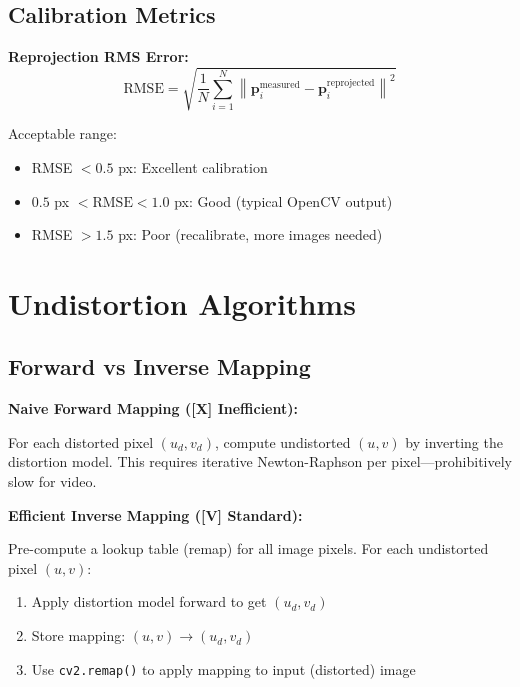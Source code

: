 \documentclass[11pt,a4paper,oneside]{article}
\begin{document}
\subsection{Calibration Metrics}

\textbf{Reprojection RMS Error:}
\begin{equation}
\text{RMSE} = \sqrt{\frac{1}{N} \sum_{i=1}^{N} \left\| \mathbf{p}_i^{\text{measured}} - \mathbf{p}_i^{\text{reprojected}} \right\|^2}
\label{eq:rmse}
\end{equation}

Acceptable range:
\begin{itemize}
    \item RMSE $< 0.5$ px: Excellent calibration
    \item $0.5$ px $< \text{RMSE} < 1.0$ px: Good (typical OpenCV output)
    \item RMSE $> 1.5$ px: Poor (recalibrate, more images needed)
\end{itemize}


\section{Undistortion Algorithms}
\label{sec:undistortion}

\subsection{Forward vs Inverse Mapping}

\textbf{Naive Forward Mapping ([X] Inefficient):}

For each distorted pixel $(u_d, v_d)$, compute undistorted $(u, v)$ by inverting the distortion model. This requires iterative Newton-Raphson per pixel—prohibitively slow for video.

\textbf{Efficient Inverse Mapping ([V] Standard):}

Pre-compute a lookup table (remap) for all image pixels. For each undistorted pixel $(u, v)$:
\begin{enumerate}
    \item Apply distortion model forward to get $(u_d, v_d)$
    \item Store mapping: $(u, v) \rightarrow (u_d, v_d)$
    \item Use \texttt{cv2.remap()} to apply mapping to input (distorted) image
\end{enumerate}
\end{document}
